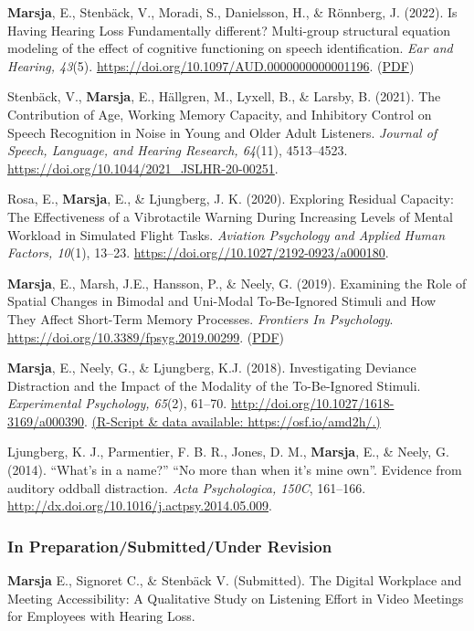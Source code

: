 \documentclass[]{article}
\begin{document}
\textbf{Marsja}, E., Stenbäck, V., Moradi, S., Danielsson, H., \&
Rönnberg, J. (2022). Is Having Hearing Loss Fundamentally different?
Multi-group structural equation modeling of the effect of cognitive
functioning on speech identification. \emph{Ear and Hearing, 43}(5).
\url{https://doi.org/10.1097/AUD.0000000000001196}.
(\href{https://tinyurl.com/eandhsem}{PDF})

Stenbäck, V., \textbf{Marsja}, E., Hällgren, M., Lyxell, B., \& Larsby,
B. (2021). The Contribution of Age, Working Memory Capacity, and
Inhibitory Control on Speech Recognition in Noise in Young and Older
Adult Listeners. \emph{Journal of Speech, Language, and Hearing
Research, 64}(11), 4513--4523.
\url{https://doi.org/10.1044/2021_JSLHR-20-00251}.

Rosa, E., \textbf{Marsja}, E., \& Ljungberg, J. K. (2020). Exploring
Residual Capacity: The Effectiveness of a Vibrotactile Warning During
Increasing Levels of Mental Workload in Simulated Flight Tasks.
\emph{Aviation Psychology and Applied Human Factors, 10}(1), 13--23.
\url{https://doi.org//10.1027/2192-0923/a000180}.

\textbf{Marsja}, E., Marsh, J.E., Hansson, P., \& Neely, G. (2019).
Examining the Role of Spatial Changes in Bimodal and Uni-Modal
To-Be-Ignored Stimuli and How They Affect Short-Term Memory Processes.
\emph{Frontiers In Psychology}.
\url{https://doi.org/10.3389/fpsyg.2019.00299}.
(\href{https://tinyurl.com/spativib}{PDF})

\textbf{Marsja}, E., Neely, G., \& Ljungberg, K.J. (2018). Investigating
Deviance Distraction and the Impact of the Modality of the To-Be-Ignored
Stimuli. \emph{Experimental Psychology, 65}(2), 61--70.
\url{http://doi.org/10.1027/1618-3169/a000390}.
\href{https://osf.io/amd2h/}{(R-Script \& data available:
https://osf.io/amd2h/.)}

Ljungberg, K. J., Parmentier, F. B. R., Jones, D. M., \textbf{Marsja},
E., \& Neely, G. (2014). ``What's in a name?'' ``No more than when it's
mine own''. Evidence from auditory oddball distraction. \emph{Acta
Psychologica, 150C}, 161--166.
\href{http://doi.org/10.1027/1618-3169/a000390}{http://dx.doi.org/10.1016/j.actpsy.2014.05.009}.

\subsubsection{In Preparation/Submitted/Under
Revision}\label{in-preparationsubmittedunder-revision}

\textbf{Marsja} E., Signoret C., \& Stenbäck V. (Submitted). The Digital
Workplace and Meeting Accessibility: A Qualitative Study on Listening
Effort in Video Meetings for Employees with Hearing Loss.
\end{document}
